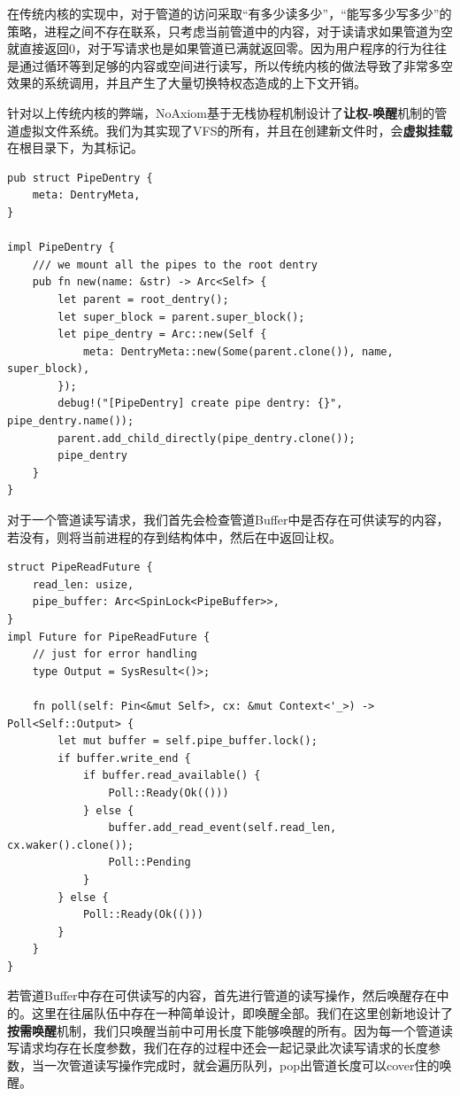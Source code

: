 \documentclass{article}
\begin{document}
在传统内核的实现中，对于管道的访问采取“有多少读多少”，“能写多少写多少”的策略，进程之间不存在联系，只考虑当前管道中的内容，对于读请求如果管道为空就直接返回0，对于写请求也是如果管道已满就返回零。因为用户程序的行为往往是通过循环等到足够的内容或空间进行读写，所以传统内核的做法导致了非常多空效果的系统调用，并且产生了大量切换特权态造成的上下文开销。

针对以上传统内核的弊端，NoAxiom基于无栈协程机制设计了\textbf{让权-唤醒}机制的管道虚拟文件系统。我们为其实现了VFS的所有，并且在创建新文件时，会\textbf{虚拟挂载}在根目录下，为其标记。

\begin{lstlisting}
pub struct PipeDentry {
    meta: DentryMeta,
}

impl PipeDentry {
    /// we mount all the pipes to the root dentry
    pub fn new(name: &str) -> Arc<Self> {
        let parent = root_dentry();
        let super_block = parent.super_block();
        let pipe_dentry = Arc::new(Self {
            meta: DentryMeta::new(Some(parent.clone()), name, super_block),
        });
        debug!("[PipeDentry] create pipe dentry: {}", pipe_dentry.name());
        parent.add_child_directly(pipe_dentry.clone());
        pipe_dentry
    }
}
\end{lstlisting}

对于一个管道读写请求，我们首先会检查管道Buffer中是否存在可供读写的内容，若没有，则将当前进程的存到结构体中，然后在中返回让权。

\begin{lstlisting}
struct PipeReadFuture {
    read_len: usize,
    pipe_buffer: Arc<SpinLock<PipeBuffer>>,
}
impl Future for PipeReadFuture {
    // just for error handling
    type Output = SysResult<()>;

    fn poll(self: Pin<&mut Self>, cx: &mut Context<'_>) -> Poll<Self::Output> {
        let mut buffer = self.pipe_buffer.lock();
        if buffer.write_end {
            if buffer.read_available() {
                Poll::Ready(Ok(()))
            } else {
                buffer.add_read_event(self.read_len, cx.waker().clone());
                Poll::Pending
            }
        } else {
            Poll::Ready(Ok(()))
        }
    }
}
\end{lstlisting}

若管道Buffer中存在可供读写的内容，首先进行管道的读写操作，然后唤醒存在中的。这里在往届队伍中存在一种简单设计，即唤醒全部。我们在这里创新地设计了\textbf{按需唤醒}机制，我们只唤醒当前中可用长度下能够唤醒的所有。因为每一个管道读写请求均存在长度参数，我们在存的过程中还会一起记录此次读写请求的长度参数，当一次管道读写操作完成时，就会遍历队列，pop出管道长度可以cover住的唤醒。
\end{document}
